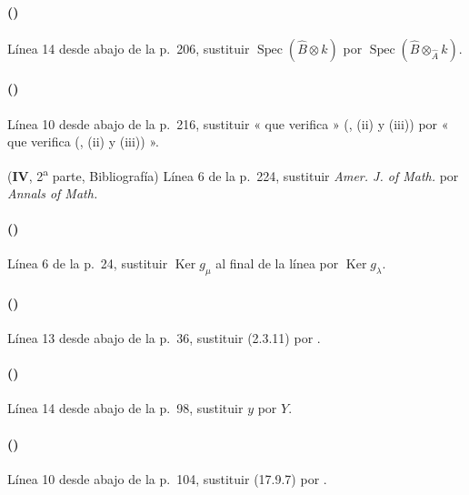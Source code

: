 \paragraph{({\texorpdfstring{\protect{}}{IV, 7.5.4}})}
Línea 14 desde abajo de la p.~206, sustituir
$\operatorname{Spec}(\widehat B\otimes k)$ por
$\operatorname{Spec}(\widehat B\otimes_{\widehat A}k)$.

\paragraph{({\texorpdfstring{\protect{}}{IV, 7.8.4}})}
Línea 10 desde abajo de la p.~216, sustituir « que verifica »
({}, (ii) y (iii)) por
« que verifica ({}, (ii) y (iii)) ».

(\textbf{IV}, 2\textsuperscript{a} parte, Bibliografía)
Línea 6 de la p.~224, sustituir \emph{Amer. J. of Math.} por
\emph{Annals of Math.}

\paragraph{({\texorpdfstring{\protect{}}{IV, 8.5.8}})}
Línea 6 de la p.~24, sustituir $\operatorname{Ker}g_\mu$ al final de
la línea por $\operatorname{Ker}g_\lambda$.

\paragraph{({\texorpdfstring{\protect{}}{IV, 8.10.1}})}
Línea 13 desde abajo de la p.~36, sustituir (2.3.11) por
{}.

\paragraph{({\texorpdfstring{\protect{}}{IV, 10.2.1}})}
Línea 14 desde abajo de la p.~98, sustituir $y$ por $Y$.

\paragraph{({\texorpdfstring{\protect{}}{IV, 10.4.11}})}
Línea 10 desde abajo de la p.~104, sustituir (17.9.7) por
{}.

